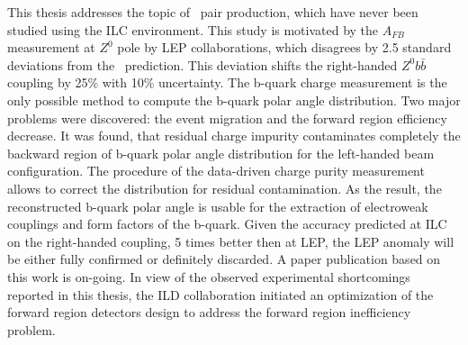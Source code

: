 This thesis addresses the topic of \bbbar\ pair production, which have never been studied using the ILC environment. 
This study is motivated by the $A_{FB}$ measurement at $Z^0$ pole by LEP collaborations, which disagrees by 2.5 standard deviations from the \sm\ prediction.
This deviation shifts the right-handed $Z^0b\bar{b}$ coupling by 25\% with 10\% uncertainty.
The b-quark charge measurement is the only possible method to compute the b-quark polar angle distribution. 
Two major problems were discovered: the event migration and the forward region efficiency decrease. 
It was found, that residual charge impurity contaminates completely the backward region of b-quark polar angle distribution for the left-handed beam configuration.
The procedure of the data-driven charge purity measurement allows to correct the distribution for residual contamination. 
As the result, the reconstructed b-quark polar angle is usable for the extraction of electroweak couplings and form factors of the b-quark. 
Given the accuracy predicted at ILC on the right-handed coupling, 5 times better then at LEP, the LEP anomaly will be either fully confirmed or definitely discarded. 
A paper publication based on this work is on-going.
In view of the observed experimental shortcomings reported in this thesis, the ILD collaboration initiated an optimization of the forward region detectors design to address the forward region inefficiency problem.

